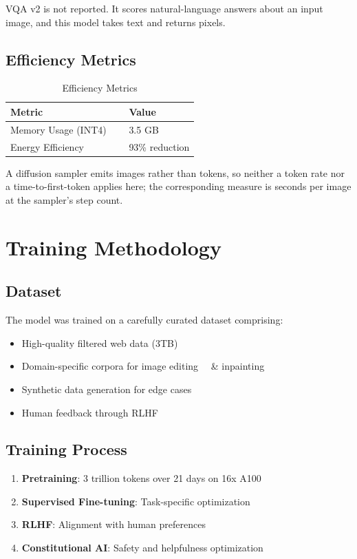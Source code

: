 \documentclass[11pt,a4paper]{article}
\begin{document}
VQA v2 is not reported. It scores natural-language answers about an input image,
and this model takes text and returns pixels.

\subsection{Efficiency Metrics}

\begin{table}[H]
\centering
\begin{tabular}{ll}
\toprule
\textbf{Metric} \ \ &   \textbf{Value} \\
\midrule
Memory Usage (INT4) \ \ &   3.5 GB \\
Energy Efficiency \ \ &   93\% reduction \\
\bottomrule
\end{tabular}
\caption{Efficiency Metrics}
\end{table}

A diffusion sampler emits images rather than tokens, so neither a token rate nor a
time-to-first-token applies here; the corresponding measure is seconds per image at
the sampler's step count.


\section{Training Methodology}

\subsection{Dataset}
The model was trained on a carefully curated dataset comprising:
\begin{itemize}
    \item High-quality filtered web data (3TB)
    \item Domain-specific corpora for image editing \ \ \&   inpainting
    \item Synthetic data generation for edge cases
    \item Human feedback through RLHF
\end{itemize}

\subsection{Training Process}
\begin{enumerate}
    \item \textbf{Pretraining}: 3 trillion tokens over 21 days on 16x A100
    \item \textbf{Supervised Fine-tuning}: Task-specific optimization
    \item \textbf{RLHF}: Alignment with human preferences
    \item \textbf{Constitutional AI}: Safety and helpfulness optimization
\end{enumerate}
\end{document}
